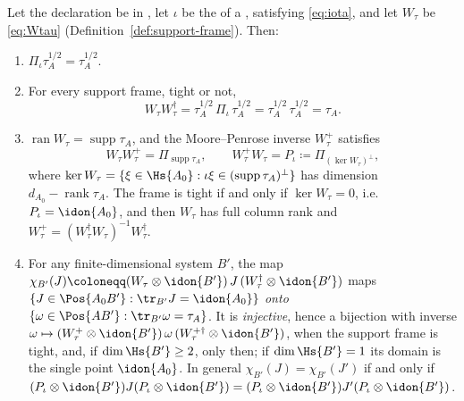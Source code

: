 \begin{lemma}\label{lem:choi-marginal}
Let the declaration be in , let $\iota$ be the
 of a , satisfying
\eqref{eq:iota}, and let $W_{\tau}$ be \eqref{eq:Wtau}
(Definition~\ref{def:support-frame}). Then:
\begin{enumerate}[label=(\roman*),leftmargin=2.2em]
\item $\Pi_{\iota}\tau_A^{1/2}=\tau_A^{1/2}$.
\item For every support frame, tight or not,
\begin{equation}\label{eq:WWtau}
  W_{\tau}W_{\tau}^{\dagger}
  =\tau_A^{1/2}\,\Pi_{\iota}\,\tau_A^{1/2}
  =\tau_A^{1/2}\,\tau_A^{1/2}=\tau_A .
\end{equation}
\item $\operatorname{ran}W_{\tau}=\operatorname{supp}\tau_A$, and the
Moore--Penrose inverse $W_{\tau}^{+}$ satisfies
\begin{equation}\label{eq:Wplus}
  W_{\tau}W_{\tau}^{+}=\Pi_{\operatorname{supp}\tau_A},
  \qquad
  W_{\tau}^{+}W_{\tau}=P_{\iota}
  \coloneqq\Pi_{(\ker W_{\tau})^{\perp}} ,
\end{equation}
where $\ker W_{\tau}=\{\xi\in\Hs{A_0}:
\iota\xi\in(\operatorname{supp}\tau_A)^{\perp}\}$ has dimension
$d_{A_0}-\operatorname{rank}\tau_A$. The frame is tight if and only if
$\ker W_{\tau}=0$, i.e.\ $P_{\iota}=\idon{A_0}$, and then $W_{\tau}$ has
full column rank and
$W_{\tau}^{+}=(W_{\tau}^{\dagger}W_{\tau})^{-1}W_{\tau}^{\dagger}$.
\item For any finite-dimensional system $B'$, the map
$\chi_{B'}(J)\coloneqq(W_{\tau}\otimes\idon{B'})\,J\,
(W_{\tau}^{\dagger}\otimes\idon{B'})$ maps
$\{J\in\Pos{A_0B'}:\tr_{B'}J=\idon{A_0}\}$ \emph{onto}
$\{\omega\in\Pos{AB'}:\tr_{B'}\omega=\tau_A\}$. It is \emph{injective},
hence a bijection with inverse
$\omega\mapsto(W_{\tau}^{+}\otimes\idon{B'})\,\omega\,
(W_{\tau}^{+\dagger}\otimes\idon{B'})$, when the support frame is tight,
and, if $\dim\Hs{B'}\ge2$, only then; if $\dim\Hs{B'}=1$ its domain is the
single point $\idon{A_0}$. In general $\chi_{B'}(J)=\chi_{B'}(J')$ if and only if
$(P_{\iota}\otimes\idon{B'})J(P_{\iota}\otimes\idon{B'})
=(P_{\iota}\otimes\idon{B'})J'(P_{\iota}\otimes\idon{B'})$.
\end{enumerate}
\end{lemma}

